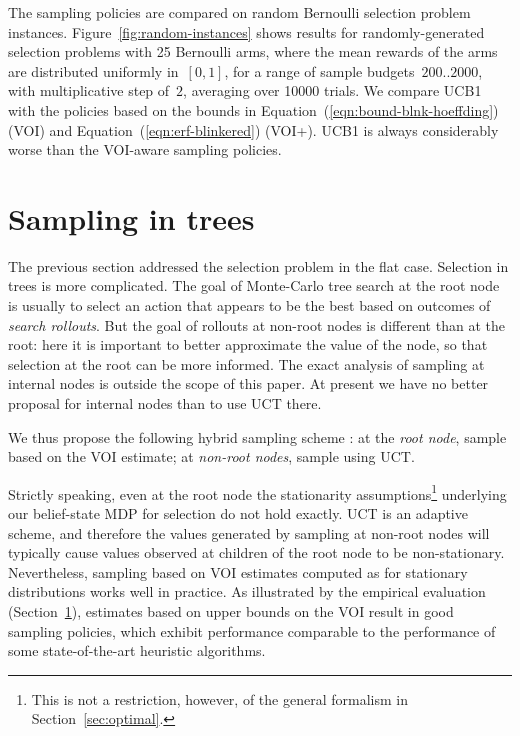 \documentclass[]{article}
\newcommand{\secref}[1]{Section~\ref{#1}}
\newcommand{\figref}[1]{Figure~\ref{#1}}
\renewcommand{\eqref}[1]{Equation~(\ref{#1})}
\begin{document}
The sampling policies are compared on random Bernoulli
selection problem instances. \figref{fig:random-instances} shows results for
randomly-generated selection problems with 25 Bernoulli arms, where
the mean rewards of the arms are distributed uniformly in~$[0,1]$, 
for a range of sample budgets~$200..2000$, with multiplicative
step of~$2$, averaging over 10000 trials.  We compare UCB1 with the 
policies based on the bounds in
\eqref{eqn:bound-blnk-hoeffding} (VOI) and
\eqref{eqn:erf-blinkered} (VOI+).
UCB1 is always considerably worse than the VOI-aware sampling policies.





\section{Sampling in trees}
\label{sec:empirical-evaluation}\label{mcts-section}

The previous section addressed the selection problem in the flat case.
Selection in trees is more complicated.  The goal of Monte-Carlo tree 
search \citep{Chaslot.montecarlo} at the root node 
is usually to select an action that appears to be the best based on outcomes
of \textit{search rollouts}.
But the goal of rollouts at non-root nodes
is different than at the root: here it is important to better approximate the
value of the node, so that selection at the root can be more informed. The exact analysis
of sampling at internal nodes is outside the scope of this paper. At present we 
have no better proposal for internal nodes than to use UCT there.

We thus propose the following hybrid sampling scheme \citep{TolpinShimony.mcts}: 
	at the \emph{root node}, sample based on the VOI estimate;
	at \emph{non-root nodes}, sample using UCT.

Strictly speaking, even at the root node the stationarity assumptions\footnote{This is not a restriction,
however, of the general formalism in \secref{sec:optimal}.} 
underlying our belief-state
MDP for selection do not hold exactly. UCT is an adaptive scheme, and therefore the values
generated by sampling at non-root nodes will typically cause values observed at
children of the root node to be non-stationary. 
Nevertheless, sampling based on VOI estimates
computed as for stationary distributions works well in
practice. As illustrated
by the empirical evaluation (\secref{sec:empirical-evaluation}),
estimates based on upper bounds on the VOI result in good sampling
policies, which exhibit performance comparable to the performance of
some state-of-the-art heuristic algorithms.
\end{document}
